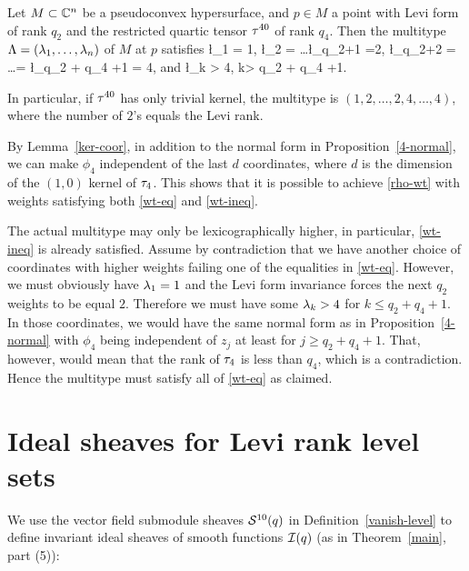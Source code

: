 \documentclass[12pt]{amsart}
\begin{document}
\bp{}
Let $M\subset {\mathbb{C}}^{n}$ be a pseudoconvex hypersurface,
and $p\in M$ a point with Levi form of rank $q_2$ 
and the restricted quartic tensor $\tau^{40}$ of rank $q_4$.
Then the multitype $\Lambda = (\lambda_1, \ldots, \lambda_{n})$ of $M$ at $p$
satisfies
\beq{}
	\l_1 = 1, 
	\quad
	\l_2 = \ldots \l_{q_2+1} =2, 
	\quad
	\l_{q_2+2} = \ldots = \l_{q_2 + q_4 +1} = 4,
\eeq
and 	
\beq{}
	\l_k > 4, \quad k> q_2 + q_4 +1.
\eeq

In particular, if $\tau^{40}$ has only trivial kernel,
the multitype is
$(1, 2,\ldots, 2, 4, \ldots, 4)$,
where the number of $2$'s equals the Levi rank.
\ep

\bpf
By Lemma~\ref{ker-coor}, 
in addition to the normal form in Proposition~\ref{4-normal},
we can make $\phi_4$ independent of the last $d$ coordinates,
where $d$ is the dimension of the $(1,0)$ kernel of $\tau_4$.
This shows that it is possible to achieve 
\eqref{rho-wt}
with weights
satisfying both \eqref{wt-eq} and \eqref{wt-ineq}.

The actual multitype may only be lexicographically higher,
in particular, \eqref{wt-ineq} is already satisfied.
Assume by contradiction that we have another choice of coordinates 
with higher weights failing one of the equalities in \eqref{wt-eq}.
However, we must obviously have $\lambda_1=1$
and the Levi form invariance forces the next $q_2$ weights to be equal $2$.
Therefore we must have some $\lambda_k > 4$ for $k\le q_2+q_4+1$.
In those coordinates, we would have the same normal form as in Proposition~\ref{4-normal}
with $\phi_4$ being independent of $z_j$ at least for $j\ge q_2 + q_4 +1$.
That, however, would mean that the rank of $\tau_4$ is less than $q_4$, which is a contradiction.
Hence the multitype must satisfy all of \eqref{wt-eq} as claimed.
\epf




\section{Ideal sheaves for Levi rank level sets}

We use the vector field submodule 
sheaves ${\mathcal{S}}^{10}(q)$ in Definition~\ref{vanish-level}
to define invariant ideal sheaves of smooth functions 
${\mathcal{I}}(q)$ (as in Theorem~\ref{main}, part (5)):


%
%
%
%
\end{document}
